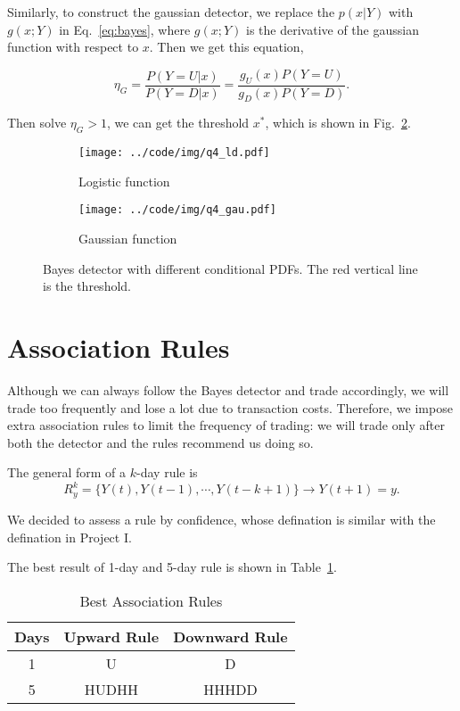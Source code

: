 \documentclass[runningheads]{llncs}
\begin{document}
Similarly, to construct the gaussian detector, we replace the $p(x|Y)$ with $g(x;Y)$ in Eq.~\eqref{eq:bayes}, where $g(x;Y)$ is the derivative of the gaussian function with respect to $x$.
Then we get this equation,

\begin{equation}
    \label{eq:bayes-gaussian}
    \eta_G=\frac{P(Y=U|x)}{P(Y=D|x)}=\frac{g_U(x)P(Y=U)}{g_D(x)P(Y=D)}.
\end{equation}

Then solve $\eta_G > 1$, we can get the threshold $x^*$, which is shown in Fig.~\ref{fig:q4_gau}.

\begin{figure}[!htbp]
    \begin{subfigure}[t]{0.49\textwidth}
        \centering
        \texttt{[image: ../code/img/q4\_ld.pdf]}
        \caption{Logistic function}
        \label{fig:q4_ld}
    \end{subfigure}
    \begin{subfigure}[t]{0.49\textwidth}
        \centering
        \texttt{[image: ../code/img/q4\_gau.pdf]}
        \caption{Gaussian function}
        \label{fig:q4_gau}
    \end{subfigure}
    \caption{Bayes detector with different conditional PDFs. The red vertical line is the threshold.}
    \label{fig:q4}
\end{figure}


\section{Association Rules}\label{sec:5}

Although we can always follow the Bayes detector and trade accordingly, we will trade too frequently and lose a lot due to transaction costs. Therefore, we impose extra association rules to limit the frequency of trading: we will trade only after both the detector and the rules recommend us doing so.

The general form of a $k$-day rule is
\begin{equation}
    \label{eq:rule}
    R_y^k=\{Y(t),Y(t-1),\cdots,Y(t-k+1)\}\rightarrow Y(t+1)=y.
\end{equation}

We decided to assess a rule by confidence, whose defination is similar with the defination in Project I.

The best result of 1-day and 5-day rule is shown in Table~\ref{tab:5}.
\begin{table}[!htbp]
    \centering
    \caption{Best Association Rules}
    \label{tab:5}
    \begin{tabular}{|c|c|c|}
        \hline
        \textbf{Days} & \textbf{Upward Rule} & \textbf{Downward Rule} \\ \hline
        1             & U                    & D                      \\ \hline
        5             & HUDHH                & HHHDD                  \\ \hline
    \end{tabular}
\end{table}
\end{document}
